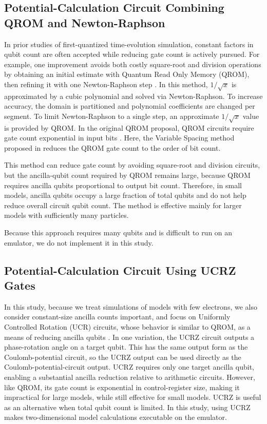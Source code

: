 \documentclass[a4paper,11pt]{article}
\begin{document}
\subsection{Potential-Calculation Circuit Combining QROM and Newton-Raphson}
\label{subsec:potential-circuit-by-qrom-newton-raphson}

In prior studies of first-quantized time-evolution simulation, constant factors
in qubit count are often accepted while reducing gate count is actively pursued.
For example, one improvement avoids both costly square-root and division
operations by obtaining an initial estimate with Quantum Read Only Memory
(QROM), then refining it with one Newton-Raphson step
\cite{Rubin2024.pnas.2317772121}. In this method, $1/\sqrt{x}$ is approximated
by a cubic polynomial and solved via Newton-Raphson. To increase accuracy, the
domain is partitioned and polynomial coefficients are changed per segment. To
limit Newton-Raphson to a single step, an approximate $1/\sqrt{x}$ value is
provided by QROM. In the original QROM proposal, QROM circuits require gate
count exponential in input bits \cite{Babbush_2018b.PhysRevX.8.041015}. Here,
the Variable Spacing method proposed in
\cite{Sanders2020.PRXQuantum.1.020312} reduces the QROM gate count to the order
of bit count.

This method can reduce gate count by avoiding square-root and division circuits,
but the ancilla-qubit count required by QROM remains large, because QROM
requires ancilla qubits proportional to output bit count. Therefore, in small
models, ancilla qubits occupy a large fraction of total qubits and do not help
reduce overall circuit qubit count. The method is effective mainly for larger
models with sufficiently many particles.

Because this approach requires many qubits and is difficult to run on an
emulator, we do not implement it in this study.

\subsection{Potential-Calculation Circuit Using UCRZ Gates}
\label{subsec:potential-circuit-by-ucrz-qubits}

In this study, because we treat simulations of models with few electrons, we
also consider constant-size ancilla counts important, and focus on Uniformly
Controlled Rotation (UCR) circuits, whose behavior is similar to QROM, as a
means of reducing ancilla qubits
\cite{Mottonen2004.PhysRevLett.93.130502}.
In one variation, the UCRZ circuit outputs a phase-rotation angle on a target
qubit. This has the same output form as the Coulomb-potential circuit, so the
UCRZ output can be used directly as the Coulomb-potential-circuit output. UCRZ
requires only one target ancilla qubit, enabling a substantial ancilla
reduction relative to arithmetic circuits. However, like QROM, its gate count
is exponential in control-register size, making it impractical for large
models, while still effective for small models. UCRZ is useful as an
alternative when total qubit count is limited. In this study, using UCRZ makes
two-dimensional model calculations executable on the emulator.
\end{document}

